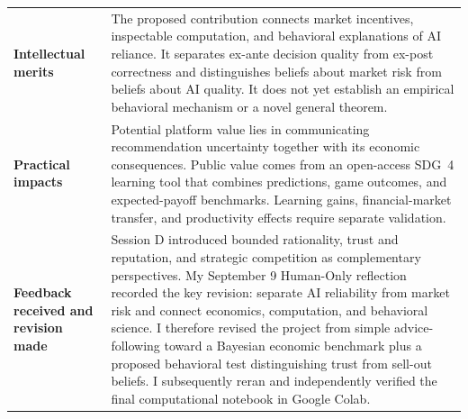 \begin{table}[ht]
\begin{tabular}{p{} p{}}
\textbf{Intellectual merits}
&
The proposed contribution connects market incentives, inspectable computation, and behavioral explanations of AI reliance. It separates ex-ante decision quality from ex-post correctness and distinguishes beliefs about market risk from beliefs about AI quality. It does not yet establish an empirical behavioral mechanism or a novel general theorem.
\\

\textbf{Practical impacts}
&
Potential platform value lies in communicating recommendation uncertainty together with its economic consequences. Public value comes from an open-access SDG~4 learning tool that combines predictions, game outcomes, and expected-payoff benchmarks. Learning gains, financial-market transfer, and productivity effects require separate validation.
\\

\textbf{Feedback received and revision made}
&
Session D introduced bounded rationality, trust and reputation, and strategic competition as complementary perspectives. My September 9 Human-Only reflection recorded the key revision: separate AI reliability from market risk and connect economics, computation, and behavioral science. I therefore revised the project from simple advice-following toward a Bayesian economic benchmark plus a proposed behavioral test distinguishing trust from sell-out beliefs. I subsequently reran and independently verified the final computational notebook in Google Colab.
\\

\bottomrule
\end{tabular}
\end{table}